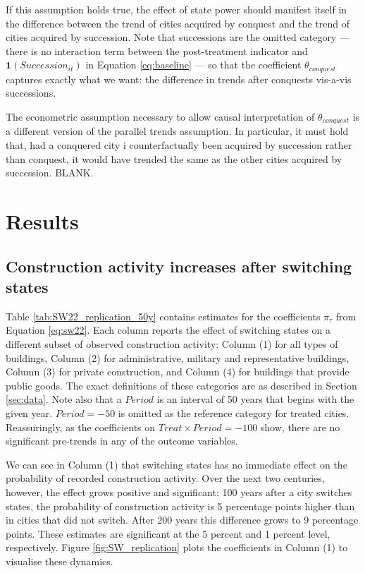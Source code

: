 \documentclass[11pt, a4paper]{article}
\begin{document}
If this assumption holds true, the effect of state power should manifest itself in the difference between the trend of cities acquired by conquest and the trend of cities acquired by succession. Note that successions are the omitted category --- there is no interaction term between the post-treatment indicator and $\mathbf{1}(Succession_{it})$ in Equation \eqref{eq:baseline} --- so that the coefficient $\theta_{conquest}$ captures exactly what we want: the difference in trends after conquests vis-a-vis successions.

The econometric assumption necessary to allow causal interpretation of $\theta_{conquest}$ is a different version of the parallel trends assumption. In particular, it must hold that, had a conquered city i counterfactually been acquired by succession rather than conquest, it would have trended the same as the other cities acquired by succession. BLANK.



\section{Results}

\subsection{Construction activity increases after switching states}

Table \ref{tab:SW22_replication_50y} contains estimates for the coefficients $\pi_\tau$ from Equation \eqref{eq:sw22}. Each column reports the effect of switching states on a different subset of observed construction activity: Column (1) for all types of buildings, Column (2) for administrative, military and representative buildings, Column (3) for private construction, and Column (4) for buildings that provide public goods. The exact definitions of these categories are as described in Section \ref{sec:data}. Note also that a $Period$ is an interval of 50 years that begins with the given year. $Period = -50$ is omitted as the reference category for treated cities. Reassuringly, as the coefficients on $Treat \times Period = -100$ show, there are no significant pre-trends in any of the outcome variables. 

We can see in Column (1) that switching states has no immediate effect on the probability of recorded construction activity. Over the next two centuries, however, the effect grows positive and significant: 100 years after a city switches states, the probability of construction activity is 5 percentage points higher than in cities that did not switch. After 200 years this difference grows to 9 percentage points. These estimates are significant at the 5 percent and 1 percent level, respectively. Figure \ref{fig:SW_replication} plots the coefficients in Column (1) to visualise these dynamics.
\end{document}
